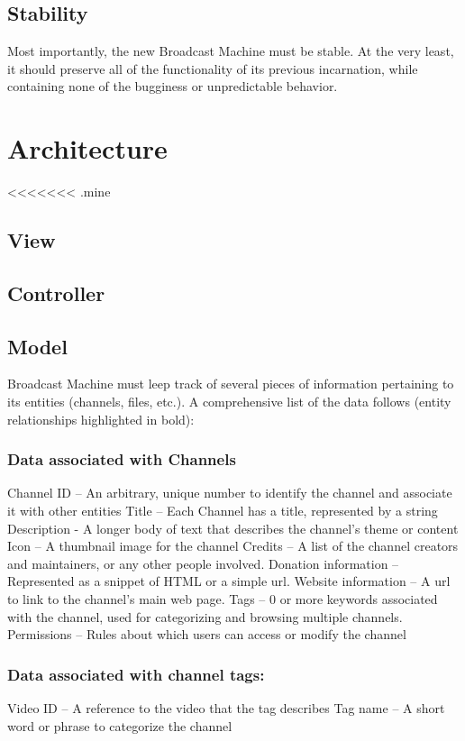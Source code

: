\documentclass[a4paper,12pt]{report}
\begin{document}
\section{Stability}

	Most importantly, the new Broadcast Machine must be stable. At the very least, it should preserve all of the functionality of its previous incarnation, while containing none of the bugginess or unpredictable behavior. 

\chapter{Architecture}

<<<<<<< .mine
\section{View}

\section{Controller}

\section{Model}
Broadcast Machine must leep track of  several pieces of information pertaining to its entities (channels, files, etc.). A comprehensive list of the data follows (entity relationships highlighted in bold):

\subsection{Data associated with Channels}
Channel ID – An arbitrary, unique number to identify the channel and associate it 		with other entities
Title – Each Channel has a title, represented by a string
Description - A longer body of text that describes the channel's theme or content
Icon – A thumbnail image for the channel
Credits – A list of the channel creators and maintainers, or any other people 	involved. 
Donation information – Represented as a snippet of HTML or a simple url.
Website information – A url to link to the channel's main web page.
Tags – 0 or more keywords associated with the channel, used for categorizing and 	browsing multiple channels.
Permissions – Rules about which users can access or modify the channel

\subsection{Data associated with channel tags:}
	Video ID – A reference to the video that the tag describes
	Tag name – A short word or phrase to categorize the channel
\end{document}
